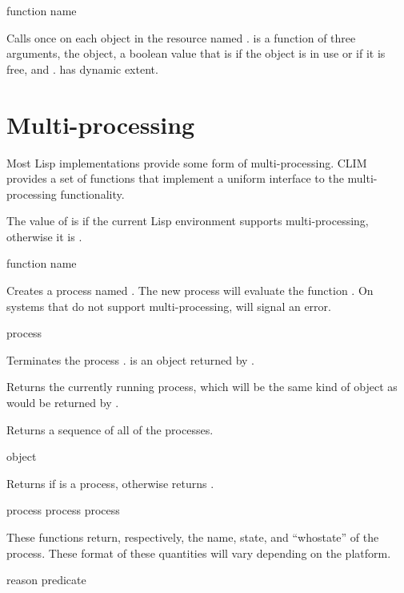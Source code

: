  {function name}

Calls  once on each object in the resource named .
 is a function of three arguments, the object, a boolean value
that is  if the object is in use or  if it is free, and
.   has dynamic extent.


\section {Multi-processing}

Most Lisp implementations provide some form of multi-processing.  CLIM provides
a set of functions that implement a uniform interface to the multi-processing
functionality.


The value of  is  if the current Lisp
environment supports multi-processing, otherwise it is .

 {function \key name}

Creates a process named .  The new process will evaluate the function
.  On systems that do not support multi-processing,
 will signal an error.

 {process}

Terminates the process .   is an object returned by
.

 {}

Returns the currently running process, which will be the same kind of object as
would be returned by .

 {}

Returns a sequence of all of the processes.

 {object}

Returns  if  is a process, otherwise returns .

 {process}
 {process}
 {process}

These functions return, respectively, the name, state, and ``whostate'' of the
process.  These format of these quantities will vary depending on the platform.

 {reason predicate}

